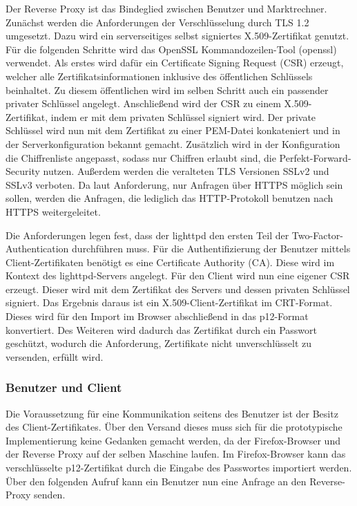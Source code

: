 \documentclass[11pt,a4paper]{report}
\begin{document}
Der Reverse Proxy ist das Bindeglied zwischen Benutzer und Marktrechner. Zunächst werden die Anforderungen der Verschlüsselung durch TLS 1.2 umgesetzt. Dazu wird ein serverseitiges selbst signiertes X.509-Zertifikat genutzt. Für die folgenden Schritte wird das OpenSSL Kommandozeilen-Tool (openssl) verwendet. Als erstes wird dafür ein Certificate Signing Request (CSR) erzeugt, welcher alle Zertifikatsinformationen inklusive des öffentlichen Schlüssels beinhaltet. Zu diesem öffentlichen wird im selben Schritt auch ein passender privater Schlüssel angelegt. Anschließend wird der CSR zu einem X.509-Zertifikat, indem er mit dem privaten Schlüssel signiert wird. Der private Schlüssel wird nun mit dem Zertifikat zu einer PEM-Datei konkateniert und in der Serverkonfiguration bekannt gemacht. Zusätzlich wird in der Konfiguration die Chiffrenliste angepasst, sodass nur Chiffren erlaubt sind, die Perfekt-Forward-Security nutzen. Außerdem werden die veralteten TLS Versionen SSLv2 und SSLv3 verboten. Da laut Anforderung, nur Anfragen über HTTPS möglich sein sollen, werden die Anfragen, die lediglich das HTTP-Protokoll benutzen nach HTTPS weitergeleitet.

Die Anforderungen legen fest, dass der lighttpd den ersten Teil der Two-Factor-Authentication durchführen muss. Für die Authentifizierung der Benutzer mittels Client-Zertifikaten benötigt es eine Certificate Authority (CA). Diese wird im Kontext des lighttpd-Servers angelegt. Für den Client wird nun eine eigener CSR erzeugt. Dieser wird mit dem Zertifikat des Servers und dessen privaten Schlüssel signiert. Das Ergebnis daraus ist ein X.509-Client-Zertifikat im CRT-Format. Dieses wird für den Import im Browser abschließend in das p12-Format konvertiert. Des Weiteren wird dadurch das Zertifikat durch ein Passwort geschützt, wodurch die Anforderung, Zertifikate nicht unverschlüsselt zu versenden, erfüllt wird.

\subsubsection{Benutzer und Client}

Die Voraussetzung für eine Kommunikation seitens des Benutzer ist der Besitz des Client-Zertifikates. Über den Versand dieses muss sich für die prototypische Implementierung keine Gedanken gemacht werden, da der Firefox-Browser und der Reverse Proxy auf der selben Maschine laufen. Im Firefox-Browser kann das verschlüsselte p12-Zertifikat durch die Eingabe des Passwortes importiert werden. Über den folgenden Aufruf kann ein Benutzer nun eine Anfrage an den Reverse-Proxy senden. 
\end{document}

